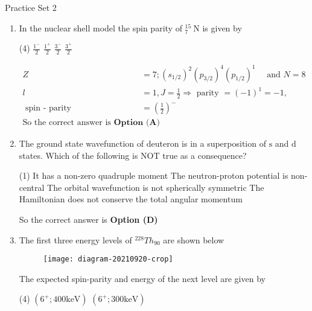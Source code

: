 \newpage
\begin{abox}
	Practice Set 2 
	\end{abox}
\begin{enumerate}
\item In the nuclear shell model the spin parity of ${ }_{7}^{15} \mathrm{~N}$ is given by
{}
\begin{tasks}(4)
\task[\textbf{A.}] $\frac{1^{-}}{2}$
\task[\textbf{B.}] $\frac{1^{+}}{2}$
\task[\textbf{C.}] $\frac{3^{-}}{2}$
\task[\textbf{D.}] $\frac{3^{+}}{2}$
\end{tasks}
\begin{answer}
\begin{align*}
Z&=7 ;\left(s_{1 / 2}\right)^{2}\left(p_{3 / 2}\right)^{4}\left(p_{1 / 2}\right)^{1} \quad\text{ and }N=8\\
l&=1, J=\frac{1}{2} \Rightarrow\text{ parity }=(-1)^{1}=-1, \\\text{ spin - parity } &=\left(\frac{1}{2}\right)^{-}\\
\text{So the correct answer is} \textbf{ Option (A)}
\end{align*}
\end{answer}
\item The ground state wavefunction of deuteron is in a superposition of $\mathrm{s}$ and $\mathrm{d}$ states. Which of the following is NOT true as a consequence?
{}
\begin{tasks}(1)
\task[\textbf{A.}]  It has a non-zero quadruple moment
\task[\textbf{B.}] The neutron-proton potential is non-central
\task[\textbf{C.}]  The orbital wavefunction is not spherically symmetric
\task[\textbf{D.}]  The Hamiltonian does not conserve the total angular momentum
\end{tasks}
\begin{answer}
So the correct answer is \textbf{Option (D)}
\end{answer}
\item The first three energy levels of ${ }^{228} T h_{90}$ are shown below\\
\begin{figure}[H]
	\centering
	\texttt{[image: diagram-20210920-crop]}
	\caption{}
	\label{}
\end{figure}
The expected spin-parity and energy of the next level are given by
{}
\begin{tasks}(4)
\task[\textbf{A.}] $\left(6^{+} ; 400 \mathrm{keV}\right)$
\task[\textbf{B.}] $\left(6^{+} ; 300 \mathrm{keV}\right)$

\end{tasks}
\end{enumerate}
